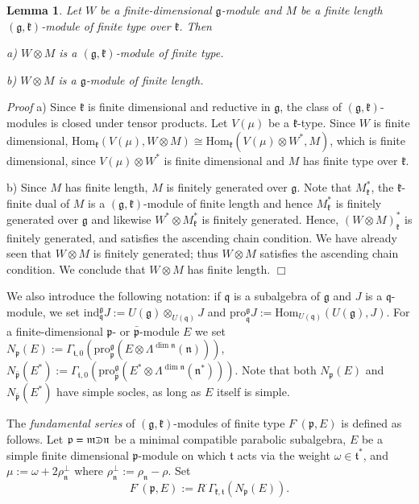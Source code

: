 \documentclass[11pt]{amsart}
\newcounter{theorem}
\newtheorem{lemma}[theo]{Lemma}
\renewenvironment{proof}{ \emph{Proof}}{$\Box$}
\renewcommand{\tt}{\mathfrak{t}}
\newcommand{\kk}{\mathfrak{k}}
\newcommand{\nn}{\mathfrak{n}}
\newcommand{\mm}{\mathfrak{m}}
\newcommand{\qq}{\mathfrak{q}}
\newcommand{\pp}{\mathfrak{p}}
\renewcommand{\gg}{\mathfrak{g}}
\newcommand{\pro}{\mathrm{pro}}
\newcommand{\ind}{\mathrm{ind}}
\newcommand{\Hom}{\mathrm{Hom}}
\def\crplus{\hbox{$\supset${\raise1.05pt\hbox{\kern -0.55em ${\scriptscriptstyle +}$}}\ }}
\begin{document}
\begin{lemma}\label{lemma1.2}
Let $W$ be a finite-dimensional $\gg$-module and $M$ be a finite length $(\gg,\kk)$-module of finite type over $\kk$. Then

a) $W\otimes M$ is a $(\gg,\kk)$-module of finite type.

b) $W\otimes M$ is a $\gg$-module of finite length.
\end{lemma}
\begin{proof}
a) Since $\kk$ is finite dimensional and reductive in $\gg$, the class of $(\gg,\kk)$-modules is closed under tensor products. Let $V(\mu)$ be a $\kk$-type. Since $W$ is finite dimensional, $\Hom_\kk(V(\mu), W\otimes M)\cong\Hom_\kk(V(\mu)\otimes W^*,M)$, which is finite dimensional, since $V(\mu)\otimes W^*$ is finite dimensional and $M$ has finite type over $\kk$.

b) Since $M$ has finite length, $M$ is finitely generated over $\gg$. Note that $M_\kk^*$, the $\kk$-finite dual of $M$ is a $(\gg,\kk)$-module of finite length and hence $M_\kk^*$ is finitely generated over $\gg$ and likewise $W^*\otimes M_\kk^*$ is finitely generated. Hence, $(W\otimes M)_\kk^*$ is finitely generated, and satisfies the ascending chain condition. We have already seen that $W\otimes M$ is finitely generated; thus $W\otimes M$ satisfies the ascending chain condition. We conclude that $W\otimes M$ has finite length.
\end{proof}

We also introduce the following notation: if $\qq$ is a subalgebra of $\gg$ and $J$ is a $\qq$-module, we set $\ind^{\gg}_\qq J:=U(\gg)\otimes_{U(\qq)}J$ and $\pro_\qq^\gg J:=\Hom_{U(\qq)}(U(\gg),J)$. For a finite-dimensional $\pp$- or $\bar{\pp}$-module $E$ we set $N_\pp(E):=\Gamma_{\tt,0}(\pro_\pp^\gg(E\otimes\Lambda^{\dim \nn}(\nn)))$, $N_{\bar{\pp}}(E^*):=\Gamma_{\tt,0}(\pro_{\bar{\pp}}^\gg(E^*\otimes\Lambda^{\dim \nn}(\nn^*)))$. Note that both $N_\pp(E)$ and $N_{\bar{\pp}}(E^*)$ have simple socles, as long as $E$ itself is simple.

The \textit{fundamental series} of $(\gg,\kk)$-modules of finite type $F^\cdot(\pp,E)$ is defined as follows. Let $\pp=\mm\crplus\nn$ be a minimal compatible parabolic subalgebra, $E$ be a simple finite dimensional $\pp$-module on which $\tt$ acts via the weight $\omega\in\tt^*$, and $\mu:=\omega+2\rho_\nn^\perp$ where $\rho_\nn^\perp :=\rho_\nn -\rho$. Set $$F^\cdot(\pp,E):=R^\cdot\Gamma_{\kk,\tt}(N_\pp(E)).$$ 
\end{document}
